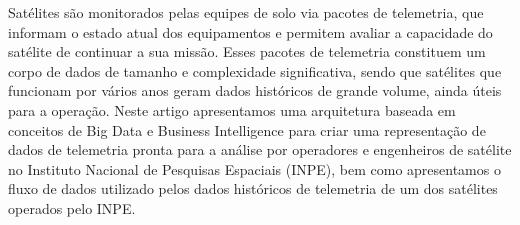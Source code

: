 
\begin{resumo}


\hypertarget{estilo:resumo}{} %

    Satélites são monitorados pelas equipes de solo via pacotes de telemetria, que informam o estado atual dos equipamentos e permitem avaliar a capacidade do satélite de continuar a sua missão. Esses pacotes de telemetria constituem um corpo de dados de tamanho e complexidade significativa, sendo que satélites que funcionam por vários anos geram dados históricos de grande volume, ainda úteis para a operação. Neste artigo apresentamos uma arquitetura baseada em conceitos de Big Data e Business Intelligence para criar uma representação de dados de telemetria pronta para a análise por operadores e engenheiros de satélite no Instituto Nacional de Pesquisas Espaciais (INPE), bem como apresentamos o fluxo de dados utilizado pelos dados históricos de telemetria de um dos satélites operados pelo INPE.

 
\end{resumo}
